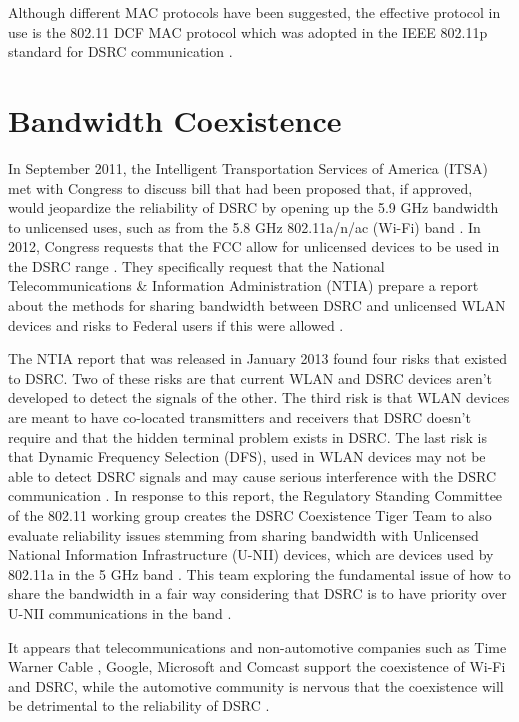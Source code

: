 \documentclass[twoside,conference]{IEEEtran}
\begin{document}
		Although different MAC protocols have been suggested, the effective protocol in use is the 802.11 DCF MAC protocol which was adopted in the IEEE 802.11p standard for DSRC communication \cite{Hassan2011}.
		
\section{Bandwidth Coexistence}\label{sec:coexistence}
		In September 2011, the Intelligent Transportation Services of America (ITSA) met with Congress to discuss bill that had been proposed that, if approved, would jeopardize the reliability of DSRC by opening up the 5.9 GHz bandwidth to unlicensed uses, such as from the 5.8 GHz 802.11a/n/ac (Wi-Fi) band \cite{ITSA2011,Lansford2013}.  In 2012, Congress requests that the FCC allow for unlicensed devices to be used in the DSRC range \cite{ITSA2014}.  They specifically request that the National Telecommunications \& Information Administration (NTIA) prepare a report about the methods for sharing bandwidth between DSRC and unlicensed WLAN devices and risks to Federal users if this were allowed \cite{HR2012}.  
		
		The NTIA report that was released in January 2013 found four risks that existed to DSRC.  Two of these risks are that current WLAN and DSRC devices aren't developed to detect the signals of the other.  The third risk is that WLAN devices are meant to have co-located transmitters and receivers that DSRC doesn't require and that the hidden terminal problem exists in DSRC.  The last risk is that Dynamic Frequency Selection (DFS), used in WLAN devices may not be able to detect DSRC signals and may cause serious interference with the DSRC communication \cite[pp. 53--54]{NTIA2013}.  In response to this report, the Regulatory Standing Committee of the 802.11 working group creates the DSRC Coexistence Tiger Team to also evaluate reliability issues stemming from sharing bandwidth with Unlicensed National Information Infrastructure (U-NII) devices, which are devices used by 802.11a in the 5 GHz band \cite[p. 14]{Lansford2013}.  This team exploring the fundamental issue of how to share the bandwidth in a fair way considering that DSRC is to have priority over U-NII communications in the band \cite[p. 5]{Lansford2014}.
		
		 It appears that telecommunications and non-automotive companies such as Time Warner Cable \cite[p. 13--14]{TWC2013}, Google, Microsoft \cite[p. 11]{MicrosoftGoogle2013} and Comcast \cite[p. 30]{Comcast2013} support the coexistence of Wi-Fi and DSRC, while the automotive community is nervous that the coexistence will be detrimental to the reliability of DSRC \cite[p. 16]{Toyota2013}.
		 
\end{document}
